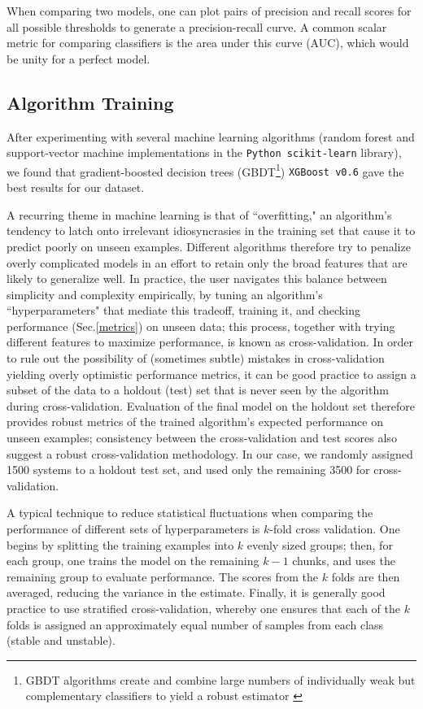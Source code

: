 When comparing two models, one can plot pairs of precision and recall scores for all possible thresholds to generate a precision-recall curve.
A common scalar metric for comparing classifiers is the area under this curve (AUC), which would be unity for a perfect model.

\subsection{Algorithm Training} \label{training}
After experimenting with several machine learning algorithms (random forest and support-vector machine implementations in the {\tt Python scikit-learn} library), we found that gradient-boosted decision trees (GBDT\footnote{GBDT algorithms create and combine large numbers of individually weak but complementary classifiers to yield a robust estimator \citep{Friedman01}}) {\tt XGBoost v0.6} \citep{Chen16} gave the best results for our dataset.

A recurring theme in machine learning is that of ``overfitting," an algorithm's tendency to latch onto irrelevant idiosyncrasies in the training set that cause it to predict poorly on unseen examples.
Different algorithms therefore try to penalize overly complicated models in an effort to retain only the broad features that are likely to generalize well.
In practice, the user navigates this balance between simplicity and complexity empirically, by tuning an algorithm's ``hyperparameters" that mediate this tradeoff, training it, and checking performance (Sec.\:\ref{metrics}) on unseen data; this process, together with trying different features to maximize performance, is known as cross-validation. 
In order to rule out the possibility of (sometimes subtle) mistakes in cross-validation yielding overly optimistic performance metrics, it can be good practice to assign a subset of the data to a holdout (test) set that is never seen by the algorithm during cross-validation.
Evaluation of the final model on the holdout set therefore provides robust metrics of the trained algorithm's expected performance on unseen examples; consistency between the cross-validation and test scores also suggest a robust cross-validation methodology.
In our case, we randomly assigned 1500 systems to a holdout test set, and used only the remaining 3500 for cross-validation.

A typical technique to reduce statistical fluctuations when comparing the performance of different sets of hyperparameters is $k$-fold cross validation.
One begins by splitting the training examples into $k$ evenly sized groups; then, for each group, one trains the model on the remaining $k-1$ chunks, and uses the remaining group to evaluate performance.
The scores from the $k$ folds are then averaged, reducing the variance in the estimate.
Finally, it is generally good practice to use stratified cross-validation, whereby one ensures that each of the $k$ folds is assigned an approximately equal number of samples from each class (stable and unstable).

